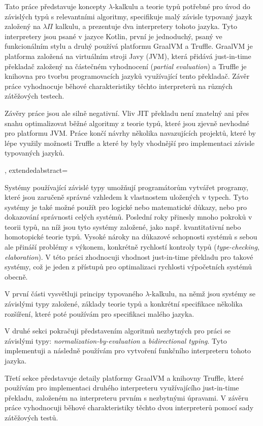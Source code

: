 {{Tato práce představuje koncepty $\lambda\text{-kalkulu}$ a teorie typů potřebné pro úvod do závislých typů s relevantními algoritmy, specifikuje malý závisle typovaný jazyk založený na $\lambda\Pi$ kalkulu, a prezentuje dva interpretery tohoto jazyka. Tyto interpretery jsou psané v jazyce Kotlin, první je jednoduchý, psaný ve funkcionálním stylu a druhý používá platformu GraalVM a Truffle. GraalVM je platforma založená na virtuálním stroji Javy (JVM), která přidává just-in-time překladač založený na částečném vyhodnocení (\textit{partial evaluation}) a Truffle je knihovna pro tvorbu programovacích jazyků využívající tento překladač. Závěr práce vyhodnocuje běhové charakteristiky těchto interpreterů na různých zátěžových testech.

Závěry práce jsou ale silně negativní. Vliv JIT překladu není znatelný ani přes snahu optimalizovat běžné algoritmy z teorie typů, které jsou zjevně nevhodné pro platformu JVM. Práce končí návrhy několika navazujících projektů, které by lépe využily možnosti Truffle a které by byly vhodnější pro implementaci závisle typovaných jazyků.

},
  extendedabstract={

Systémy používající závislé typy umožňují programátorům vytvářet programy, které jsou zaručeně správné vzhledem k vlastnostem uložených v typech. Tyto systémy je také možné použít pro logické nebo matematické důkazy, nebo pro dokazování správnosti celých systémů. Poslední roky přinesly mnoho pokroků v teorii typů, na níž jsou tyto systémy založené, jako např. kvantitativní nebo homotopické teorie typů. Vysoké nároky na důkazové schopnosti systémů s sebou ale přináší problémy s výkonem, konkrétně rychlostí kontroly typů (\textit{type-checking}, \textit{elaboration}). V této práci zhodnocuji vhodnost just-in-time překladu pro takové systémy, což je jeden z přístupů pro optimalizaci rychlosti výpočetních systémů obecně.

  V první části vysvětluji principy typovaného $\lambda\text{-kalkulu}$, na němž jsou systémy se závislými typy založené, základy teorie typů a konkrétní specifikace několika rozšíření, které poté používám pro specifikaci malého jazyka.

  V druhé sekci pokračuji představením algoritmů nezbytných pro práci se závislými typy: \textit{normalization-by-evaluation} a \textit{bidirectional typing}. Tyto implementuji a následně používám pro vytvoření funkčního interpreteru tohoto jazyka.

  Třetí sekce představuje detaily platformy GraalVM a knihovny Truffle, které používám pro implementaci druhého interpreteru využívajícího just-in-time překladu, založeném na interpreteru prvním s nezbytnými úpravami.  V závěru práce vyhodnocuji běhové charakteristiky těchto dvou interpreterů pomocí sady zátěžových testů.

}}
